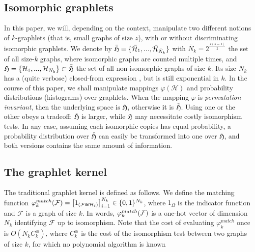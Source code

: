 \documentclass{article}
\begin{document}
\subsection{Isomorphic graphlets}

In this paper, we will, depending on the context, manipulate two different notions of $k$-graphlets (that is, small graphs of size $z$), with or without discriminating isomorphic graphlets. We denote by $\bar{\mathfrak{H}}=\{\bar{\mathcal{H}}_1,..., \bar{\mathcal{H}}_{\bar N_k}\}$ with $\bar{N}_k = 2^{\frac{k(k-1)}{2}}$ the set of all size-$k$ graphs, where isomorphic graphs are counted multiple times, and $\mathfrak{H}=\{\mathcal{H}_1,..., \mathcal{H}_{N_k}\} \subset \bar{\mathfrak{H}}$ the set of all non-isomorphic graphs of size $k$. Its size $N_k$ has a (quite verbose) closed-from expression \cite{oeid}, but is still exponential in $k$.
%
In the course of this paper, we shall manipulate mappings $\varphi(\mathcal{H})$ and probability distributions (histograms) over graphlets. When the mapping $\varphi$ is \emph{permutation-invariant}, then the underlying space is $\mathfrak{H}$, otherwise it is $\bar{\mathfrak{H}}$. Using one or the other obeys a tradeoff: $\bar{\mathfrak{H}}$ is larger, while $\mathfrak{H}$ may necessitate costly isomorphism tests. In any case, assuming each isomorphic copies has equal probability, a probability distribution over $\bar{\mathfrak{H}}$ can easily be transformed into one over $\mathfrak{H}$, and both versions contains the same amount of information.

\subsection{The graphlet kernel}

The traditional graphlet kernel is defined as follows. We define the matching function $\varphi_k^{match}(\mathcal{F}) = \left[ 1_{(\mathcal{F} \cong \mathcal{H}_i)}\right]_{i=1}^{N_k} \in \{0,1\}^{N_k}$, where $1_\Omega$ is the indicator function and $\mathcal{F}$ is a graph of size $k$. In words, $\varphi^{match}_k(\mathcal{F})$ is a one-hot vector of dimension $N_k$ identifying $\mathcal{F}$ up to isomorphism. Note that the cost of evaluating $\varphi_k^{match}$ once is $O\left(N_k C^{\cong}_k\right)$, where $C^{\cong}_k$ is the cost of the isomorphism test between two graphs of size $k$, for which no polynomial algorithm is known \cite{isomorphism_np}
\end{document}
